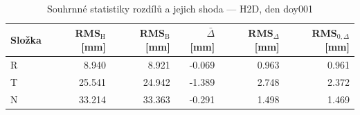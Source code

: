 \begin{table}[H]
\centering
\caption{Souhrnné statistiky rozdílů a jejich shoda — H2D, den doy001}
\label{tab:hermite_vs_bernese_h2d_doy001_summary}
\begin{tabular}{lrrrrr}
\toprule
Složka & RMS$_\mathrm{H}$ [mm] & RMS$_\mathrm{B}$ [mm] & $\bar{\Delta}$ [mm] & RMS$_{\Delta}$ [mm] & RMS$_{0,\Delta}$ [mm] \\
\midrule
R & 8.940 & 8.921 & -0.069 & 0.963 & 0.961 \\
T & 25.541 & 24.942 & -1.389 & 2.748 & 2.372 \\
N & 33.214 & 33.363 & -0.291 & 1.498 & 1.469 \\
\bottomrule
\end{tabular}
\end{table}
